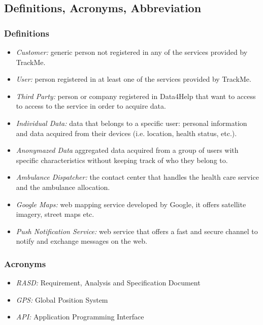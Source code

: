 \documentclass[a4paper]{article}
\begin{document}
\subsection{Definitions, Acronyms, Abbreviation}

\subsubsection{Definitions}
    
    \begin{itemize}
        \item \textit{Customer:} generic person not registered in any of the services provided by TrackMe. 
        \item \textit{User:} person registered in at least one of the services provided by TrackMe.
        \item \textit{Third Party:} person or company registered in Data4Help that want to access to access to the service in order to acquire data.
        \item \textit{Individual Data:} data that belongs to a specific user: personal information and data acquired from their devices (i.e. location, health status, etc.).
        \item \textit{Anonymazed Data} aggregated data acquired from a group of users with specific characteristics without keeping track of who they belong to.
        \item \textit{Ambulance Dispatcher:} the contact center that handles the health care service and the ambulance allocation.
        \item \textit{Google Maps:} web mapping service developed by Google, it offers satellite imagery, street maps etc.
        \item \textit{Push Notification Service:} web service that offers a fast and secure channel to notify and exchange messages on the web.
    \end{itemize}
    
    \subsubsection{Acronyms}
    
    \begin{itemize}
        \item \textit{RASD:} Requirement, Analysis and Specification Document
        \item \textit{GPS:} Global Position System
        \item \textit{API:} Application Programming Interface
    \end{itemize}
    
\end{document}
